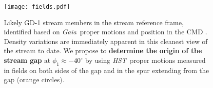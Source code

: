 \documentclass[12pt]{article}
\newcommand{\hst}{\textsl{HST}}
\newcommand{\gaia}{\textsl{Gaia}}
\begin{document}

\begin{figure}
\begin{center}
\texttt{[image: fields.pdf]}
\end{center}
\caption{
Likely GD-1 stream members in the stream reference frame, identified based on \gaia\ proper motions and position in the CMD \parencite{pwb2018}.
Density variations are immediately apparent in this cleanest view of the stream to date.
We propose to {\bf determine the origin of the stream gap} at $\phi_1\approx-40^\circ$ by using \hst\ proper motions measured in fields on both sides of the gap and in the spur extending from the gap (orange circles).
}
\label{fig:fields}
\end{figure}
\end{document}

